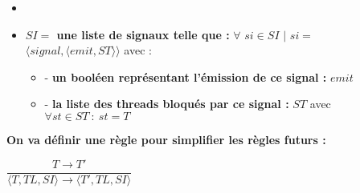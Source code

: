 \documentclass[10pt,a4paper]{article}
\begin{document}
\begin{itemize}
\begin{itemize}
\begin{itemize}
\begin{itemize}
							\end{itemize}
						\end{itemize}	
					\end{itemize}
					\item[]
					\item[] \textbf{$SI =$ une liste de signaux telle que :} $\forall$ $si \in SI$ $|$ $si =$ $\langle signal,\langle emit,ST\rangle\rangle$ avec :
					\begin{itemize}
						\item[] - \textbf{un booléen représentant l'émission de ce signal :} $emit$
						\item[] - \textbf{la liste des threads bloqués par ce signal :} $ST$ avec $\forall st \in ST~:~st = T$
					\end{itemize}
				\end{itemize}
				\bigbreak
				\bigbreak
					
			
			
			
				\textbf{On va définir une règle pour simplifier les règles futurs :} 
				\begin{center}
						$\dfrac{T \rightarrow T'}{\langle T,TL,SI\rangle \rightarrow \langle T',TL,SI\rangle}$
				\end{center}
				\bigbreak
				\bigbreak
					
					
					
\end{document}
